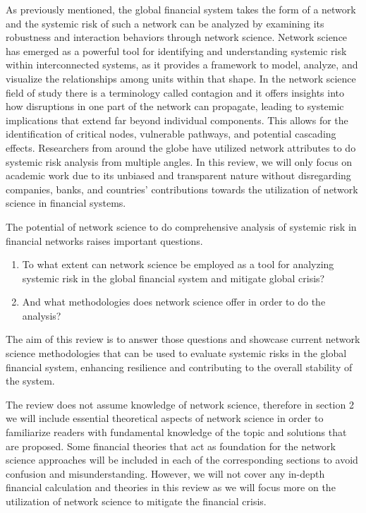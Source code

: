 \documentclass[a4paper,11pt]{article}
\begin{document}
As previously mentioned, the global financial system takes the form of a network and the systemic risk of such a network can be analyzed by examining its robustness and interaction behaviors through network science. Network science has emerged as a powerful tool for identifying and understanding systemic risk within interconnected systems, as it provides a framework to model, analyze, and visualize the relationships among units within that shape. In the network science field of study there is a terminology called contagion and it offers insights into how disruptions in one part of the network can propagate, leading to systemic implications that extend far beyond individual components. This allows for the identification of critical nodes, vulnerable pathways, and potential cascading effects. Researchers from around the globe have utilized network attributes to do systemic risk analysis from multiple angles. In this review, we will only focus on academic work due to its unbiased and transparent nature without disregarding companies, banks, and countries' contributions towards the utilization of network science in financial systems.

The potential of network science to do comprehensive analysis of systemic risk in financial networks raises important questions.
\begin{enumerate}
    \item To what extent can network science be employed as a tool for analyzing systemic risk in the global financial system and mitigate global crisis? 
    \item And what methodologies does network science offer in order to do the analysis? 
\end{enumerate}
The aim of this review is to answer those questions and showcase current network science methodologies that can be used to evaluate systemic risks in the global financial system, enhancing resilience and contributing to the overall stability of the system. 

The review does not assume knowledge of network science, therefore in section 2 we will include essential theoretical aspects of network science in order to familiarize readers with fundamental knowledge of the topic and solutions that are proposed. Some financial theories that act as foundation for the network science approaches will be included in each of the corresponding sections to avoid confusion and misunderstanding. However, we will not cover any in-depth financial calculation and theories in this review as we will focus more on the utilization of network science to mitigate the financial crisis.
\end{document}
